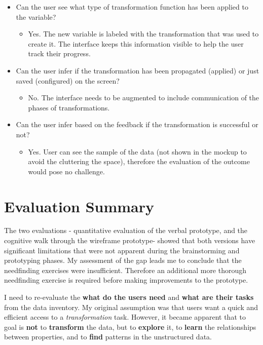 \documentclass[12pt,letterpaper]{article}
\begin{document}
\begin{itemize}
\begin{itemize}
\begin{itemize}
        \end{itemize}
        \item Can the user see what type of transformation function has been applied to the variable?
        \begin{itemize}
                \item Yes. The new variable is labeled with the transformation that was used to create it. The interface keeps this information visible to help the user track their progress.
        \end{itemize}
        \item Can the user infer if the transformation has been propagated (applied) or just saved (configured) on the screen?
        \begin{itemize}
                \item No. The interface needs to be augmented to include communication of the phases of transformations. 
        \end{itemize}
        \item Can the user infer based on the feedback if the transformation is successful or not?
        \begin{itemize}
                \item Yes. User can see the sample of the data (not shown in the mockup to avoid the cluttering the space), therefore the evaluation of the outcome would pose no challenge. 
        \end{itemize}
    \end{itemize}
\end{itemize}


\section*{Evaluation Summary}

The two evaluations - quantitative evaluation of the verbal prototype, and the cognitive walk through the wireframe prototype-  showed that both versions have significant limitations that were not apparent during the brainstorming and prototyping phases. My assessment of the gap leads me to conclude that the needfinding exercises were insufficient. Therefore an additional more thorough needfinding exercise is required before making improvements to the prototype.  

I need to re-evaluate the \textbf{what do the users need} and \textbf{what are their tasks} from the data inventory. My original assumption was that users want a quick and efficient access to a \textit{transformation} task. However, it became apparent that to goal is \textbf{not} to \textbf{transform} the data, but to \textbf{explore} it, to \textbf{learn} the relationships between properties, and to \textbf{find} patterns in the unstructured data. 
\end{document}
